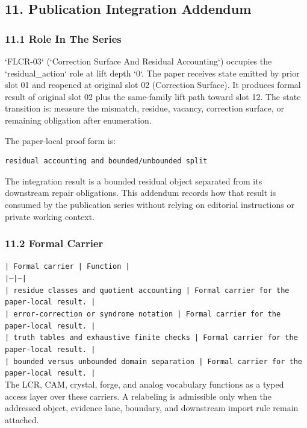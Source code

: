 \documentclass[11pt]{article}
\begin{document}
\subsection*{11. Publication Integration Addendum}

\subsubsection*{11.1 Role In The Series}

`FLCR-03` (`Correction Surface And Residual Accounting`) occupies the `residual\_action` role at lift depth `0`.
The paper receives state emitted by prior slot 01 and reopened at original slot 02 (Correction Surface). It produces formal result of original slot 02 plus the same-family lift path toward slot 12. The state transition is:
measure the mismatch, residue, vacancy, correction surface, or remaining obligation after enumeration.

The paper-local proof form is:

\begin{verbatim}
residual accounting and bounded/unbounded split
\end{verbatim}

The integration result is a bounded residual object separated from its downstream repair obligations. This addendum records how that result is
consumed by the publication series without relying on editorial instructions or
private working context.

\subsubsection*{11.2 Formal Carrier}

\noindent\texttt{| Formal carrier | Function |}\\
\noindent\texttt{|---|---|}\\
\noindent\texttt{| residue classes and quotient accounting | Formal carrier for the paper-local result. |}\\
\noindent\texttt{| error-correction or syndrome notation | Formal carrier for the paper-local result. |}\\
\noindent\texttt{| truth tables and exhaustive finite checks | Formal carrier for the paper-local result. |}\\
\noindent\texttt{| bounded versus unbounded domain separation | Formal carrier for the paper-local result. |}\\

The LCR, CAM, crystal, forge, and analog vocabulary functions as a typed access
layer over these carriers. A relabeling is admissible only when the addressed
object, evidence lane, boundary, and downstream import rule remain attached.
\end{document}
